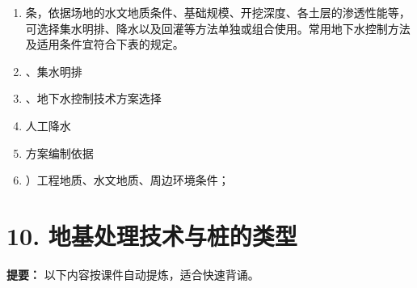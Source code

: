 \documentclass[UTF8,fontset=fandol,11pt]{ctexart}
\begin{document}
\begin{enumerate}[label=\arabic*.]
\item 条，依据场地的水文地质条件、基础规模、开挖深度、各土层的渗透性能等，可选择集水明排、降水以及回灌等方法单独或组合使用。常用地下水控制方法及适用条件宜符合下表的规定。

\item 、集水明排

\item 、地下水控制技术方案选择

\item 人工降水

\item 方案编制依据

\item ）工程地质、水文地质、周边环境条件；

\end{enumerate}

\newpage

\section*{10. 地基处理技术与桩的类型}


\begin{mainbox}

\textbf{提要：} 以下内容按课件自动提炼，适合快速背诵。

\end{mainbox}
\end{document}
